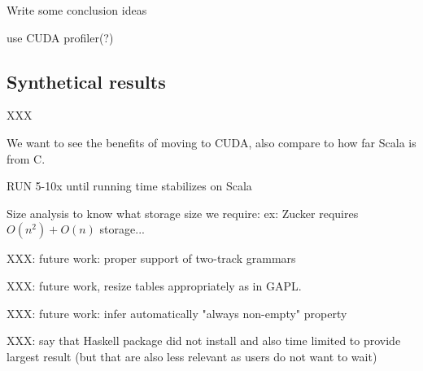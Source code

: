 {\color{red}\ol
\item Write some conclusion ideas
\item use CUDA profiler(?)
\ole}

\subsection{Synthetical results}
XXX

{\color{red} We want to see the benefits of moving to CUDA, also compare to how far Scala is from C.}

RUN 5-10x until running time stabilizes on Scala

 {\color{red} Size analysis to know what storage size we require: ex: Zucker requires $O(n^2)+O(n)$ storage...}

XXX: future work: proper support of two-track grammars

XXX: future work, resize tables appropriately as in GAPL.

XXX: future work: infer automatically "always non-empty" property

{\color{red} XXX: say that Haskell package did not install and also time limited to provide largest result (but that are also less relevant as users do not want to wait)}

%
